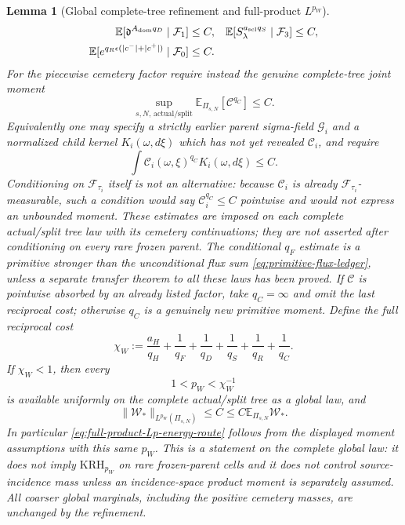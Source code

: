 \documentclass[11pt]{article}
\newtheorem{lemma}[theorem]{Lemma}
\begin{document}
\begin{lemma}[Global complete-tree refinement and full-product $L^{p_W}$]
\begin{align}
 \mathbb E[\mathfrak d^{A_{\rm dom}q_D}\mid\mathcal F_1]&\le C,&
 \mathbb E[S_\lambda^{a_{\rm scl}q_S}\mid\mathcal F_3]&\le C,
 \notag\\
 \mathbb E[e^{q_R\epsilon(|c^-|+|c^+|)}\mid\mathcal F_0]&\le C.
 \notag
\end{align}
For the piecewise cemetery factor require instead the genuine complete-tree
joint moment
\begin{equation}
\label{eq:complete-tree-cemetery-moment}
 \sup_{s,N,\,\mathrm{actual/split}}
 \mathbb E_{\Pi_{s,N}}[\mathcal C^{q_C}]\le C.
\end{equation}
Equivalently one may specify a strictly earlier parent sigma-field
$\mathcal G_i$ and a normalized child kernel $K_i(\omega,d\xi)$ which has not
yet revealed $\mathcal C_i$, and require
\begin{equation}
\label{eq:parent-kernel-cemetery-moment}
 \int \mathcal C_i(\omega,\xi)^{q_C}K_i(\omega,d\xi)\le C.
\end{equation}
Conditioning on $\mathcal F_{\tau_i}$ itself is not an alternative: because
$\mathcal C_i$ is already $\mathcal F_{\tau_i}$-measurable, such a condition
would say $\mathcal C_i^{q_C}\le C$ pointwise and would not express an
unbounded moment.  These estimates are imposed on each complete
actual/split tree law with its cemetery continuations; they are not asserted
after conditioning on every rare frozen parent.  The conditional
$q_F$ estimate is a primitive stronger than the unconditional flux sum
\eqref{eq:primitive-flux-ledger}, unless a separate transfer theorem to all
these laws has been proved.  If $\mathcal C$ is pointwise absorbed by an
already listed factor, take $q_C=\infty$ and omit the last reciprocal cost;
otherwise $q_C$ is a genuinely new primitive moment.
Define the full reciprocal cost
\begin{equation}
\label{eq:full-product-reciprocal-cost}
 \chi_W:=\frac{a_H}{q_H}+\frac1{q_F}+\frac1{q_D}
       +\frac1{q_S}+\frac1{q_R}+\frac1{q_C}.
\end{equation}
If $\chi_W<1$, then every
\begin{equation}
\label{eq:available-full-product-pW}
 1<p_W<\chi_W^{-1}
\end{equation}
is available uniformly on the complete actual/split tree as a global law,
and
\begin{equation}
\label{eq:proved-full-product-Lp}
 \|\mathscr W_*\|_{L^{p_W}(\Pi_{s,N})}
 \le C\le C\mathbb E_{\Pi_{s,N}}\mathscr W_*.
\end{equation}
In particular \eqref{eq:full-product-Lp-energy-route} follows from the
displayed moment assumptions with this same $p_W$.  This is a statement on
the complete global law: it does not imply \(\mathrm{KRH}_{p_W}\) on rare
frozen-parent cells and it does not control source-incidence mass unless an
incidence-space product moment is separately assumed.  All coarser global
marginals, including the positive cemetery masses, are unchanged by the
refinement.
\end{lemma}
\end{document}
